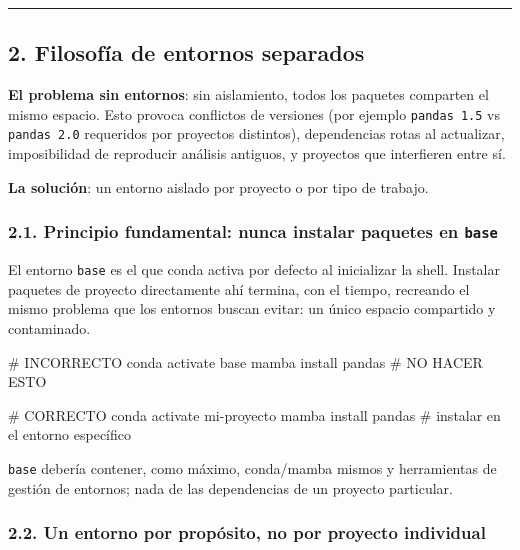 \documentclass[
  doc,
  floatsintext,
  longtable,
  a4paper,
  nolmodern,
  notxfonts,
  notimes,
  12pt,
  colorlinks=true,linkcolor=blue,citecolor=blue,urlcolor=blue]{apa7}
\newenvironment{Shaded}{\begin{snugshade}}{\end{snugshade}}
\newcommand{\CommentTok}[1]{\textcolor[rgb]{0.37,0.37,0.37}{#1}}
\newcommand{\ExtensionTok}[1]{\textcolor[rgb]{0.00,0.23,0.31}{#1}}
\newcommand{\NormalTok}[1]{\textcolor[rgb]{0.00,0.23,0.31}{#1}}
\begin{document}
\begin{center}\rule{0.5\linewidth}{0.5pt}\end{center}

\subsection{2. Filosofía de entornos
separados}\label{filosofuxeda-de-entornos-separados}

\textbf{El problema sin entornos}: sin aislamiento, todos los paquetes
comparten el mismo espacio. Esto provoca conflictos de versiones (por
ejemplo \texttt{pandas\ 1.5} vs \texttt{pandas\ 2.0} requeridos por
proyectos distintos), dependencias rotas al actualizar, imposibilidad de
reproducir análisis antiguos, y proyectos que interfieren entre sí.

\textbf{La solución}: un entorno aislado por proyecto o por tipo de
trabajo.

\subsubsection{\texorpdfstring{2.1. Principio fundamental: nunca
instalar paquetes en
\texttt{base}}{2.1. Principio fundamental: nunca instalar paquetes en base}}\label{principio-fundamental-nunca-instalar-paquetes-en-base}

El entorno \texttt{base} es el que conda activa por defecto al
inicializar la shell. Instalar paquetes de proyecto directamente ahí
termina, con el tiempo, recreando el mismo problema que los entornos
buscan evitar: un único espacio compartido y contaminado.

\begin{Shaded}
\begin{Highlighting}[]
\CommentTok{\# INCORRECTO}
\ExtensionTok{conda}\NormalTok{ activate base}
\ExtensionTok{mamba}\NormalTok{ install pandas   }\CommentTok{\# NO HACER ESTO}

\CommentTok{\# CORRECTO}
\ExtensionTok{conda}\NormalTok{ activate mi{-}proyecto}
\ExtensionTok{mamba}\NormalTok{ install pandas   }\CommentTok{\# instalar en el entorno específico}
\end{Highlighting}
\end{Shaded}

\texttt{base} debería contener, como máximo, conda/mamba mismos y
herramientas de gestión de entornos; nada de las dependencias de un
proyecto particular.

\subsubsection{2.2. Un entorno por propósito, no por proyecto
individual}\label{un-entorno-por-propuxf3sito-no-por-proyecto-individual}
\end{document}
